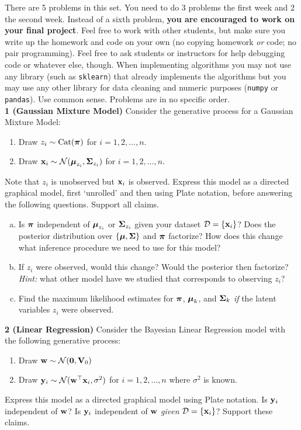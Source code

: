 \documentclass[12pt,letterpaper,fleqn]{hmcpset}
\begin{document}
There are 5 problems in this set. You need to do 3 problems the first week and 2 the second
week. Instead of a sixth problem, \textbf{you are encouraged to work on your final project}.
Feel free to work with other students, but make sure you write up the homework
and code on your own (no copying homework \textit{or} code; no pair programming).
Feel free to ask students or instructors for help debugging code or whatever else,
though.
When implementing algorithms you may not use any library (such as \texttt{sklearn})
that already implements the algorithms but you may use any other library for
data cleaning and numeric purposes (\texttt{numpy} or \texttt{pandas}). Use common
sense. Problems are in no specific order.\\[1em]

\textbf{1 (Gaussian Mixture Model)} Consider the generative process for a Gaussian
Mixture Model:
\begin{enumerate}[(1)]
    \item Draw $z_i \sim \mathrm{Cat}(\hbox{\boldmath$\pi$})$ for $i=1,2,\dots,n$.
    \item Draw ${\bf x}_i \sim {\cal N}(\hbox{\boldmath$\mu$}_{z_i}, \hbox{\boldmath$\Sigma$}_{z_i})$ for $i=1,2,\dots,n$.
\end{enumerate}
Note that $z_i$ is unobserved but ${\bf x}_i$ is observed.
Express this model as a directed graphical model, first `unrolled' and then using
Plate notation, before answering the following questions. Support all claims.
\begin{enumerate}[(a)]
    \item Is $\hbox{\boldmath$\pi$}$ independent of $\hbox{\boldmath$\mu$}_{z_i}$ or $\hbox{\boldmath$\Sigma$}_{z_i}$ given
        your dataset ${\cal D} = \{{\bf x}_i\}$? Does the posterior distribution over
        $\{\hbox{\boldmath$\mu$},\hbox{\boldmath$\Sigma$}\}$ and $\hbox{\boldmath$\pi$}$ factorize? How does this change what inference
        procedure we need to use for this model?
    \item If $z_i$ were observed, would this change? Would the posterior then
        factorize? \textit{Hint:} what other model have we studied that corresponds to
        observing $z_i$?
    \item Find the maximum likelihood estimates for $\hbox{\boldmath$\pi$}$, $\hbox{\boldmath$\mu$}_k$, and $\hbox{\boldmath$\Sigma$}_k$
        \textit{if} the latent variables $z_i$ were observed.\\
\end{enumerate}

\textbf{2 (Linear Regression)} Consider the Bayesian Linear Regression model with
the following generative process:
\begin{enumerate}[(1)]
    \item Draw ${\bf w} \sim {\cal N}({\bf 0}, \mathbf{V}_0)$
    \item Draw ${\bf y}_i \sim {\cal N}({\bf w}^\top{\bf x}_i, \sigma^2)$ for $i=1,2,\dots,n$ where $\sigma^2$
        is known.
\end{enumerate}
Express this model as a directed graphical model using Plate notation. Is ${\bf y}_i$
independent of ${\bf w}$? Is ${\bf y}_i$ independent of ${\bf w}$ \textit{given} ${\cal D} = \{{\bf x}_i\}$? Support
these claims.\newpage
\end{document}
